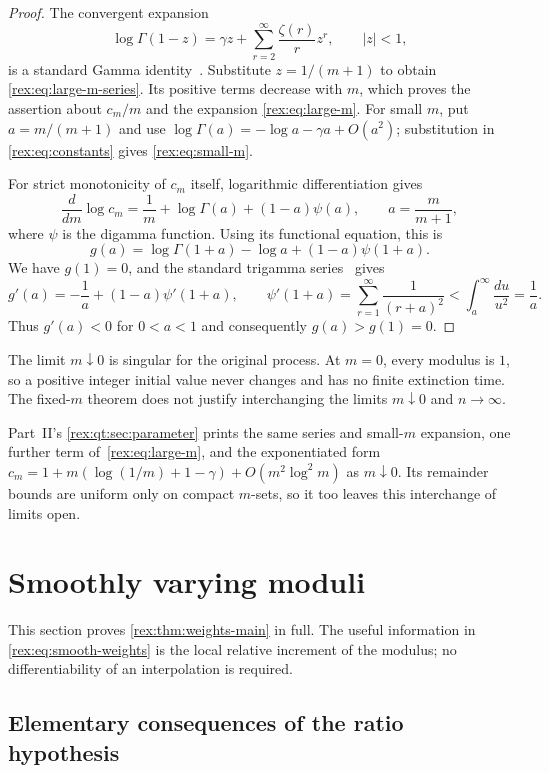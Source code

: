 \begin{proof}
The convergent expansion
\[
 \log\Gamma(1-z)=\gamma z+
      \sum_{r=2}^{\infty}\frac{\zeta(r)}r z^r,
 \qquad |z|<1,
\]
is a standard Gamma identity~\cite{dlmf}. Substitute $z=1/(m+1)$
to obtain \cref{rex:eq:large-m-series}. Its positive terms decrease with
$m$, which proves the assertion about $c_m/m$ and the expansion
\cref{rex:eq:large-m}. For small $m$, put $a=m/(m+1)$ and use
$\log\Gamma(a)=-\log a-\gamma a+O(a^2)$; substitution in
\cref{rex:eq:constants} gives \cref{rex:eq:small-m}.

For strict monotonicity of $c_m$ itself, logarithmic differentiation gives
\[
 \frac{d}{dm}\log c_m
 =\frac1m+\log\Gamma(a)+(1-a)\psi(a),
 \qquad a=\frac m{m+1},
\]
where $\psi$ is the digamma function. Using its functional equation,
this is
\[
 g(a)=\log\Gamma(1+a)-\log a+(1-a)\psi(1+a).
\]
We have $g(1)=0$, and the standard trigamma series~\cite{dlmf} gives
\[
 g'(a)=-\frac1a+(1-a)\psi'(1+a),\qquad
 \psi'(1+a)=\sum_{r=1}^{\infty}\frac1{(r+a)^2}
           <\int_a^{\infty}\frac{du}{u^2}=\frac1a.
\]
Thus $g'(a)<0$ for $0<a<1$ and consequently $g(a)>g(1)=0$.
\end{proof}

The limit $m\downarrow0$ is singular for the original process. At
$m=0$, every modulus is $1$, so a positive integer initial value never
changes and has no finite extinction time. The fixed-$m$ theorem does
not justify interchanging the limits $m\downarrow0$ and $n\to\infty$.

\begin{writenote}
Part~II's \cref{rex:qt:sec:parameter} prints the same series and
small-$m$ expansion, one further term of~\eqref{rex:eq:large-m}, and the
exponentiated form $c_m=1+m(\log(1/m)+1-\gamma)+O(m^2\log^2m)$ as
$m\downarrow0$. Its remainder bounds are uniform only on compact $m$-sets,
so it too leaves this interchange of limits open.
\end{writenote}

\section{Smoothly varying moduli}\label{rex:sec:weights}

This section proves \cref{rex:thm:weights-main} in full. The useful
information in \cref{rex:eq:smooth-weights} is the local relative increment
of the modulus; no differentiability of an interpolation is required.

\subsection{Elementary consequences of the ratio hypothesis}

